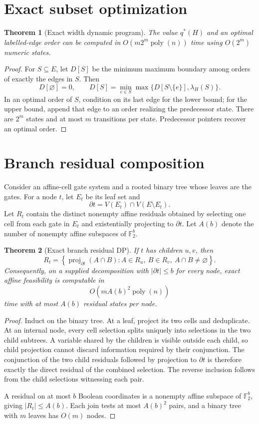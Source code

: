 \documentclass[11pt]{article}
\newtheorem{theorem}{Theorem}
\newcommand{\F}{\mathbb{F}}
\newcommand{\bd}{\partial}
\begin{document}
\section{Exact subset optimization}
\begin{theorem}[Exact width dynamic program]
The value $q^*(H)$ and an optimal labelled-edge order can be computed in
$O(m2^m\operatorname{poly}(n))$ time using $O(2^m)$ numeric states.
\end{theorem}

\begin{proof}
For $S\subseteq E$, let $D[S]$ be the minimum maximum boundary among orders of
exactly the edges in $S$.  Then
\[
 D[\varnothing]=0,\qquad
 D[S]=\min_{e\in S}\max\{D[S\setminus\{e\}],\lambda_H(S)\}.
\]
In an optimal order of $S$, condition on its last edge for the lower bound; for
the upper bound, append that edge to an order realizing the predecessor state.
There are $2^m$ states and at most $m$ transitions per state.  Predecessor
pointers recover an optimal order.
\end{proof}

\section{Branch residual composition}
Consider an affine-cell gate system and a rooted binary tree whose leaves are
the gates.  For a node $t$, let $E_t$ be its leaf set and
\[
 \bd t=V(E_t)\cap V(E\setminus E_t).
\]
Let $R_t$ contain the distinct nonempty affine residuals obtained by selecting
one cell from each gate in $E_t$ and existentially projecting to $\bd t$.
Let $A(b)$ denote the number of nonempty affine subspaces of $\F_2^b$.

\begin{theorem}[Exact branch residual DP]
If $t$ has children $u,v$, then
\[
 R_t=\left\{
 \operatorname{proj}_{\bd t}(A\cap B):
 A\in R_u,\ B\in R_v,\ A\cap B\ne\varnothing
 \right\}.
\]
Consequently, on a supplied decomposition with $|\bd t|\le b$ for every node,
exact affine feasibility is computable in
\[
 O\!\left(mA(b)^2\operatorname{poly}(n)\right)
\]
time with at most $A(b)$ residual states per node.
\end{theorem}

\begin{proof}
Induct on the binary tree.  At a leaf, project its two cells and deduplicate.
At an internal node, every cell selection splits uniquely into selections in
the two child subtrees.  A variable shared by the children is visible outside
each child, so child projection cannot discard information required by their
conjunction.  The conjunction of the two child residuals followed by projection
to $\bd t$ is therefore exactly the direct residual of the combined selection.
The reverse inclusion follows from the child selections witnessing each pair.

A residual on at most $b$ Boolean coordinates is a nonempty affine subspace of
$\F_2^b$, giving $|R_t|\le A(b)$.  Each join tests at most $A(b)^2$ pairs, and
a binary tree with $m$ leaves has $O(m)$ nodes.
\end{proof}
\end{document}
